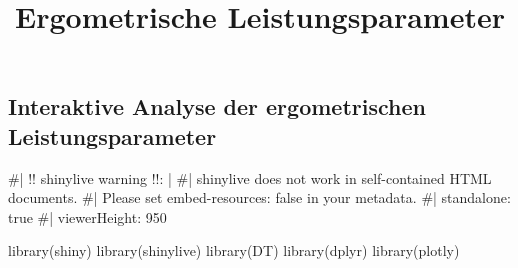 \documentclass[
  letterpaper,
  DIV=11]{scrartcl}
\title{Ergometrische Leistungsparameter}
\author{}
\date{}
\newenvironment{Shaded}{\begin{snugshade}}{\end{snugshade}}
\newcommand{\NormalTok}[1]{\textcolor[rgb]{0.00,0.23,0.31}{#1}}
\begin{document}
\maketitle

\subsection{Interaktive Analyse der ergometrischen
Leistungsparameter}\label{interaktive-analyse-der-ergometrischen-leistungsparameter}

\begin{Shaded}
\begin{Highlighting}[]
\NormalTok{\#| \textquotesingle{}!! shinylive warning !!\textquotesingle{}: |}
\NormalTok{\#|   shinylive does not work in self{-}contained HTML documents.}
\NormalTok{\#|   Please set \textasciigrave{}embed{-}resources: false\textasciigrave{} in your metadata.}
\NormalTok{\#| standalone: true}
\NormalTok{\#| viewerHeight: 950}

\NormalTok{library(shiny)}
\NormalTok{library(shinylive)}
\NormalTok{library(DT)}
\NormalTok{library(dplyr)}
\NormalTok{library(plotly)}


\end{Highlighting}
\end{Shaded}
\end{document}
